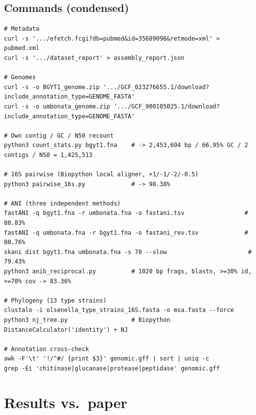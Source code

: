 \documentclass[11pt]{article}
\begin{document}
\subsection{Commands (condensed)}
\begin{verbatim}
# Metadata
curl -s '.../efetch.fcgi?db=pubmed&id=35689096&retmode=xml' > pubmed.xml
curl -s '.../dataset_report' > assembly_report.json

# Genomes
curl -s -o BGYT1_genome.zip '.../GCF_023276655.1/download?include_annotation_type=GENOME_FASTA'
curl -s -o umbonata_genome.zip '.../GCF_900105025.1/download?include_annotation_type=GENOME_FASTA'

# Own contig / GC / N50 recount
python3 count_stats.py bgyt1.fna    # -> 2,453,694 bp / 66.95% GC / 2 contigs / N50 = 1,425,513

# 16S pairwise (Biopython local aligner, +1/-1/-2/-0.5)
python3 pairwise_16s.py             # -> 98.38%

# ANI (three independent methods)
fastANI -q bgyt1.fna -r umbonata.fna -o fastani.tsv                 # 80.83%
fastANI -q umbonata.fna -r bgyt1.fna -o fastani_rev.tsv             # 80.76%
skani dist bgyt1.fna umbonata.fna -s 70 --slow                       # 79.43%
python3 anib_reciprocal.py          # 1020 bp frags, blastn, >=30% id, >=70% cov -> 83.36%

# Phylogeny (13 type strains)
clustalo -i olsenella_type_strains_16S.fasta -o msa.fasta --force
python3 nj_tree.py                  # Biopython DistanceCalculator('identity') + NJ

# Annotation cross-check
awk -F'\t' '!/^#/ {print $3}' genomic.gff | sort | uniq -c
grep -Ei 'chitinase|glucanase|protease|peptidase' genomic.gff
\end{verbatim}

\section{Results vs.\ paper}
\end{document}

